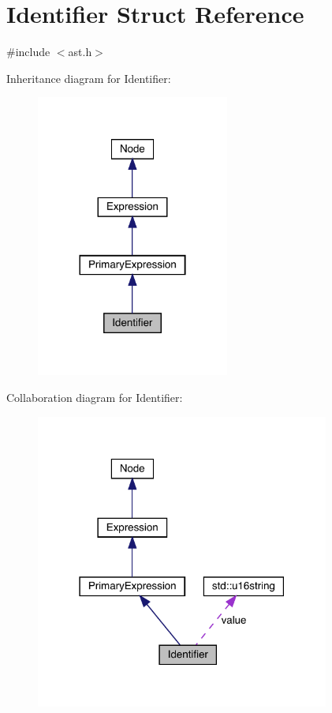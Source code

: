 \hypertarget{struct_identifier}{}\section{Identifier Struct Reference}
\label{struct_identifier}


{\ttfamily \#include $<$ast.\+h$>$}



Inheritance diagram for Identifier\+:\nopagebreak
\begin{figure}[H]
\begin{center}
\leavevmode
\includegraphics[width=180pt]{struct_identifier__inherit__graph}
\end{center}
\end{figure}


Collaboration diagram for Identifier\+:\nopagebreak
\begin{figure}[H]
\begin{center}
\leavevmode
\includegraphics[width=274pt]{struct_identifier__coll__graph}
\end{center}
\end{figure}
